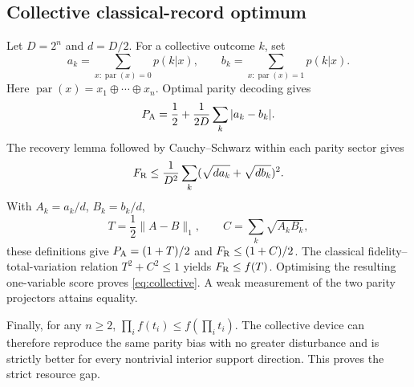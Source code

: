 \subsection{Collective classical-record optimum}

Let $D=2^n$ and $d=D/2$. For a collective outcome $k$, set
\[
a_k=\sum_{x:\operatorname{par}(x)=0}p(k|x),\qquad
b_k=\sum_{x:\operatorname{par}(x)=1}p(k|x).
\]
Here $\operatorname{par}(x)=x_1\oplus\cdots\oplus x_n$.
Optimal parity decoding gives
\[
P_{\mathrm A}=\frac12+\frac1{2D}\sum_k|a_k-b_k|.
\]
The recovery lemma followed by Cauchy--Schwarz within each parity sector gives
\[
F_{\mathrm R}\leq\frac1{D^2}\sum_k(\sqrt{da_k}+\sqrt{db_k})^2.
\]
With $A_k=a_k/d$, $B_k=b_k/d$,
\[
T=\frac12\lVert A-B\rVert_1,\qquad C=\sum_k\sqrt{A_kB_k},
\]
these definitions give $P_{\mathrm A}=(1+T)/2$ and $F_{\mathrm R}\leq(1+C)/2$. The classical fidelity--total-variation relation $T^2+C^2\leq1$ \cite{fuchs1999cryptographic} yields $F_{\mathrm R}\leq f(T)$. Optimising the resulting one-variable score proves \eqref{eq:collective}. A weak measurement of the two parity projectors attains equality.

Finally, for any $n\geq2$, $\prod_i f(t_i)\leq f(\prod_i t_i)$. The collective device can therefore reproduce the same parity bias with no greater disturbance and is strictly better for every nontrivial interior support direction. This proves the strict resource gap.
